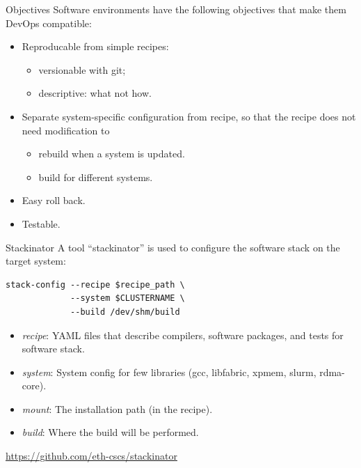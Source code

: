 \documentclass[aspectratio=43]{beamer}
\begin{document}
\begin{frame}[fragile]{Objectives}
    Software environments have the following objectives that make them DevOps compatible:
    \begin{itemize}
        \item Reproducable from simple recipes:
        \begin{itemize}
            \item versionable with git;
            \item descriptive: what not how.
        \end{itemize}
        \item Separate system-specific configuration from recipe, so that the recipe does not need modification to
        \begin{itemize}
            \item rebuild when a system is updated.
            \item build for different systems.
        \end{itemize}
        \item Easy roll back.
        \item Testable.
    \end{itemize}
\end{frame}


\begin{frame}[fragile]{Stackinator}
    A tool ``stackinator'' is used to configure the software stack on the target system:

            \begin{lstlisting}[style=talkbash]
            stack-config --recipe $recipe_path \
             --system $CLUSTERNAME \
             --build /dev/shm/build
            \end{lstlisting}

    \begin{itemize}
        \item \emph{recipe}: YAML files that describe compilers, software packages, and tests for software stack.
        \item \emph{system}: System config for few libraries (gcc, libfabric, xpmem, slurm, rdma-core).
        \item \emph{mount}: The installation path (in the recipe).
        \item \emph{build}: Where the build will be performed.
    \end{itemize}

    \url{https://github.com/eth-cscs/stackinator}
\end{frame}
\end{document}
